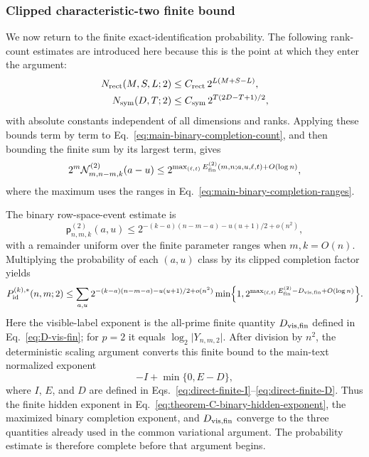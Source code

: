 \documentclass[11pt]{article}
\newcommand{\1}{\mathbf 1}
\theoremstyle{plain}
\theoremstyle{definition}
\theoremstyle{remark}
\begin{document}
\subsubsection{Clipped characteristic-two finite bound}\label{subsubsec:binary-clipped-finite-bound}
\label{subsec:binary-probability-completion-estimate}


We now return to the finite exact-identification probability.  The following
rank-count estimates are introduced here because this is the point at which
they enter the argument:
\begin{align}
 N_{\rm rect}(M,S,L;2)
 &\le C_{\rm rect}\,2^{L(M+S-L)},
 \label{eq:main-binary-rectangular-bound}\\
 N_{\rm sym}(D,T;2)
 &\le C_{\rm sym}\,2^{T(2D-T+1)/2},
 \label{eq:main-binary-symmetric-bound}
\end{align}
with absolute constants independent of all dimensions and ranks.  Applying these bounds term by term to
Eq.~\eqref{eq:main-binary-completion-count}, and then bounding the finite sum
by its largest term, gives
\begin{equation}
 2^m\mathcal N_{m,n-m,k}^{(2)}(a-u)
 \le
 2^{\max_{(\ell,t)}E_{\rm fin}^{(2)}(m,n;a,u,\ell,t)+O(\log n)},
 \label{eq:main-binary-completion-exponent-bound}
\end{equation}
where the maximum uses the ranges in
Eq.~\eqref{eq:main-binary-completion-ranges}.

The binary row-space-event estimate is
\begin{equation}
 \mathsf p_{n,m,k}^{(2)}(a,u)
 \le 2^{-(k-a)(n-m-a)-u(u+1)/2+o(n^2)},
 \label{eq:main-binary-lower-block-probability}
\end{equation}
with a remainder uniform over the finite parameter ranges when $m,k=O(n)$.
Multiplying the probability of each $(a,u)$ class by its clipped completion
factor yields
\begin{align}
 P_{\mathrm{id}}^{(k),*}(n,m;2)
 \le\sum_{a,u}
 2^{-(k-a)(n-m-a)-u(u+1)/2+o(n^2)}
 \min\Bigl\{1,
 2^{\max_{(\ell,t)}E_{\rm fin}^{(2)}
       -D_{\rm vis,fin}+O(\log n)}\Bigr\}.
 \label{eq:detail-main-binary-finite-exponent-bound}
\end{align}
Here the visible-label exponent is the all-prime finite quantity
$D_{\rm vis,fin}$ defined in Eq.~\eqref{eq:D-vis-fin}; for $p=2$ it equals
$\log_2\lvert Y_{n,m,2}\rvert$.
After division by $n^2$, the deterministic scaling argument converts this
finite bound to the main-text normalized exponent
\[
 -I+\min\{0,E-D\},
\]
where $I$, $E$, and $D$ are defined in
Eqs.~\eqref{eq:direct-finite-I}--\eqref{eq:direct-finite-D}.  Thus the finite
hidden exponent in Eq.~\eqref{eq:theorem-C-binary-hidden-exponent}, the
maximized binary completion exponent, and $D_{\rm vis,fin}$ converge to the
three quantities already used in the common variational argument.  The
probability estimate is therefore complete before that argument begins.
\end{document}
